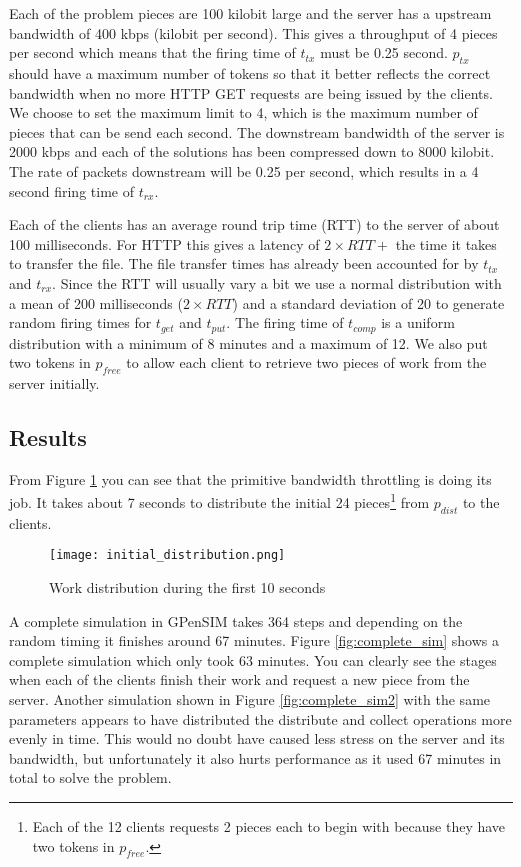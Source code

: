 Each of the problem pieces are 100 kilobit large and the server has a upstream bandwidth of 400 kbps (kilobit per second).
This gives a throughput of 4 pieces per second which means that the firing time of $t_{tx}$ must be 0.25 second.
$p_{tx}$ should have a maximum number of tokens so that it better reflects the correct bandwidth when no more HTTP GET requests are being issued by the clients.
We choose to set the maximum limit to 4, which is the maximum number of pieces that can be send each second.
The downstream bandwidth of the server is 2000 kbps and each of the solutions has been compressed down to 8000 kilobit.
The rate of packets downstream will be 0.25 per second, which results in a 4 second firing time of $t_{rx}$.

Each of the clients has an average round trip time (RTT) to the server of about 100 milliseconds.
For HTTP this gives a latency of $2 \times RTT +$ the time it takes to transfer the file.
The file transfer times has already been accounted for by $t_{tx}$ and $t_{rx}$.
Since the RTT will usually vary a bit we use a normal distribution with a mean of 200 milliseconds ($2 \times RTT$) and a standard deviation of 20 to generate random firing times for $t_{get}$ and $t_{put}$.
The firing time of $t_{comp}$ is a uniform distribution with a minimum of 8 minutes and a maximum of 12.
We also put two tokens in $p_{free}$ to allow each client to retrieve two pieces of work from the server initially.


\subsection{Results}

From Figure \ref{fig:initdist} you can see that the primitive bandwidth throttling is doing its job.
It takes about 7 seconds to distribute the initial 24 pieces\footnote{Each of the 12 clients requests 2 pieces each to begin with because they have two tokens in $p_{free}$.} from $p_{dist}$ to the clients.

\begin{figure}[htbp]
	\centering 
	\texttt{[image: initial\_distribution.png]}
	\caption{Work distribution during the first 10 seconds}
	\label{fig:initdist}
\end{figure}

\noindent A complete simulation in GPenSIM takes 364 steps and depending on the random timing it finishes around 67 minutes.
Figure \ref{fig:complete_sim} shows a complete simulation which only took 63 minutes.
You can clearly see the stages when each of the clients finish their work and request a new piece from the server.
Another simulation shown in Figure \ref{fig:complete_sim2} with the same parameters appears to have distributed the distribute and collect operations more evenly in time.
This would no doubt have caused less stress on the server and its bandwidth, but unfortunately it also hurts performance as it used 67 minutes in total to solve the problem.

